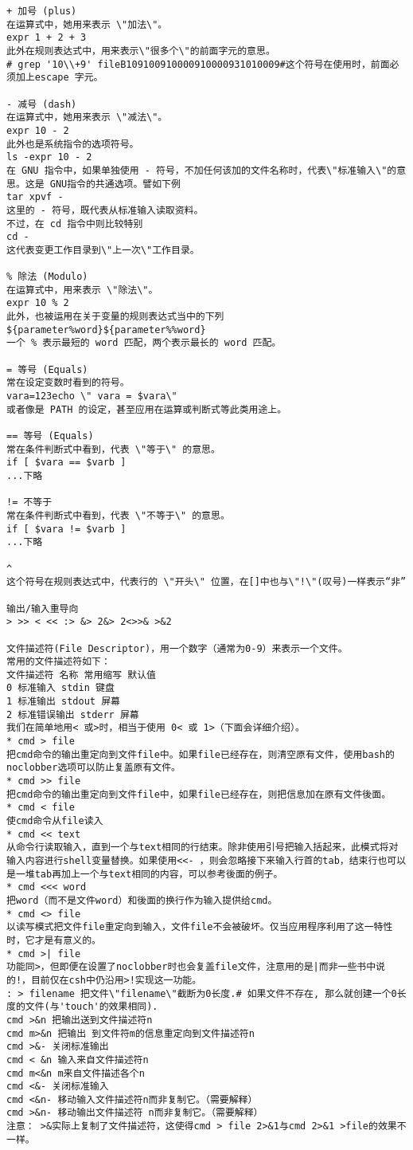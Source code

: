 \begin{lstlisting}
+ 加号 (plus)
在运算式中，她用来表示 \"加法\"。
expr 1 + 2 + 3
此外在规则表达式中，用来表示\"很多个\"的前面字元的意思。
# grep '10\\+9' fileB109100910000910000931010009#这个符号在使用时，前面必须加上escape 字元。

- 减号 (dash)
在运算式中，她用来表示 \"减法\"。
expr 10 - 2
此外也是系统指令的选项符号。
ls -expr 10 - 2
在 GNU 指令中，如果单独使用 - 符号，不加任何该加的文件名称时，代表\"标准输入\"的意思。这是 GNU指令的共通选项。譬如下例
tar xpvf -
这里的 - 符号，既代表从标准输入读取资料。
不过，在 cd 指令中则比较特别
cd -
这代表变更工作目录到\"上一次\"工作目录。

% 除法 (Modulo)
在运算式中，用来表示 \"除法\"。
expr 10 % 2
此外，也被运用在关于变量的规则表达式当中的下列
${parameter%word}${parameter%%word}
一个 % 表示最短的 word 匹配，两个表示最长的 word 匹配。

= 等号 (Equals)
常在设定变数时看到的符号。
vara=123echo \" vara = $vara\"
或者像是 PATH 的设定，甚至应用在运算或判断式等此类用途上。

== 等号 (Equals)
常在条件判断式中看到，代表 \"等于\" 的意思。
if [ $vara == $varb ]
...下略

!= 不等于
常在条件判断式中看到，代表 \"不等于\" 的意思。
if [ $vara != $varb ]
...下略

^
这个符号在规则表达式中，代表行的 \"开头\" 位置，在[]中也与\"!\"(叹号)一样表示“非”

输出/输入重导向
> >> < << :> &> 2&> 2<>>& >&2

文件描述符(File Descriptor)，用一个数字（通常为0-9）来表示一个文件。
常用的文件描述符如下：
文件描述符 名称 常用缩写 默认值
0 标准输入 stdin 键盘
1 标准输出 stdout 屏幕
2 标准错误输出 stderr 屏幕
我们在简单地用< 或>时，相当于使用 0< 或 1>（下面会详细介绍）。
* cmd > file
把cmd命令的输出重定向到文件file中。如果file已经存在，则清空原有文件，使用bash的noclobber选项可以防止复盖原有文件。
* cmd >> file
把cmd命令的输出重定向到文件file中，如果file已经存在，则把信息加在原有文件後面。
* cmd < file
使cmd命令从file读入
* cmd << text
从命令行读取输入，直到一个与text相同的行结束。除非使用引号把输入括起来，此模式将对输入内容进行shell变量替换。如果使用<<- ，则会忽略接下来输入行首的tab，结束行也可以是一堆tab再加上一个与text相同的内容，可以参考後面的例子。
* cmd <<< word
把word（而不是文件word）和後面的换行作为输入提供给cmd。
* cmd <> file
以读写模式把文件file重定向到输入，文件file不会被破坏。仅当应用程序利用了这一特性时，它才是有意义的。
* cmd >| file
功能同>，但即便在设置了noclobber时也会复盖file文件，注意用的是|而非一些书中说的!，目前仅在csh中仍沿用>!实现这一功能。
: > filename 把文件\"filename\"截断为0长度.# 如果文件不存在, 那么就创建一个0长度的文件(与'touch'的效果相同).
cmd >&n 把输出送到文件描述符n
cmd m>&n 把输出 到文件符m的信息重定向到文件描述符n
cmd >&- 关闭标准输出
cmd < &n 输入来自文件描述符n
cmd m<&n m来自文件描述各个n
cmd <&- 关闭标准输入
cmd <&n- 移动输入文件描述符n而非复制它。（需要解释）
cmd >&n- 移动输出文件描述符 n而非复制它。（需要解释）
注意： >&实际上复制了文件描述符，这使得cmd > file 2>&1与cmd 2>&1 >file的效果不一样。
\end{lstlisting}
